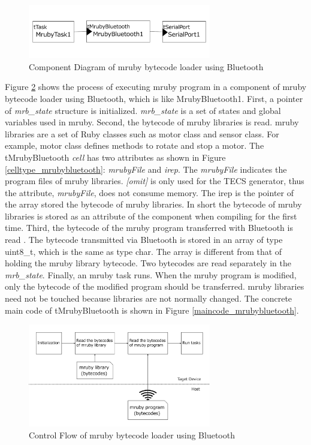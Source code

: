 \documentclass[conference,compsoc]{IEEEtran}
\begin{document}
\begin{figure}[t]
    \centering
    \includegraphics[width=8cm,clip]{figure/component_bluetooth.pdf}
    \caption{Component Diagram of mruby bytecode loader using Bluetooth}
    \label{fig:component_bluetooth}
\end{figure}

Figure \ref{fig:control_flow} shows the process of executing mruby program in a component of mruby bytecode loader using Bluetooth, which is like MrubyBluetooth1.
First, a pointer of {\it mrb\_state} structure is initialized.
{\it mrb\_state} is a set of states and global variables used in mruby.
Second, the bytecode of mruby libraries is read.
mruby libraries are a set of Ruby classes such as motor class and sensor class.
For example, motor class defines methods to rotate and stop a motor.
The tMrubyBluetooth {\it cell} has two attributes as shown in Figure \ref{celltype_mrubybluetooth}: {\it mrubyFile} and {\it irep}.
The {\it mrubyFile} indicates the program files of mruby libraries.
{\it [omit]} is only used for the TECS generator, thus the attribute, {\it mrubyFile}, does not consume memory.
The irep is the pointer of the array stored the bytecode of mruby libraries.
In short the bytecode of mruby libraries is stored as an attribute of the component when compiling for the first time.
Third, the bytecode of the mruby program transferred with Bluetooth is read .
The bytecode transmitted via Bluetooth is stored in an array of type uint8\_t, which is the same as type char.
The array is different from that of holding the mruby library bytecode.
Two bytecodes are read separately in the {\it mrb\_state}.
Finally, an mruby task runs.
When the mruby program is modified, only the bytecode of the modified program should be transferred.
mruby libraries need not be touched because libraries are not normally changed.
The concrete main code of tMrubyBluetooth is shown in Figure \ref{maincode_mrubybluetooth}.
\begin{figure}[t]
    \centering
    \includegraphics[width=8cm,clip]{figure/control_flow.pdf}
    \caption{Control Flow of mruby bytecode loader using Bluetooth}
    \label{fig:control_flow}
\end{figure}
\end{document}
